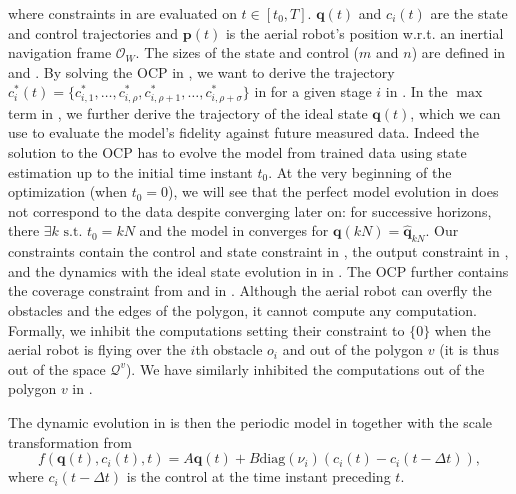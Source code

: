 where constraints in  are evaluated on $t\in[t_0,T]$. $\mathbf{q}(t)$ and $c_i(t)$ are the state and control trajectories and $\mathbf{p}(t)$ is the aerial robot's position w.r.t. an inertial navigation frame $\mathcal{O}_W$. The sizes of the state and control ($m$ and $n$) are defined in  and . By solving the OCP in , we want to derive the trajectory $c_i^*(t)=\{c^*_{i,1},\dots,c^*_{i,\rho},c^*_{i,\rho+1},\dots,c^*_{i,\rho+\sigma}\}$ in  for a given stage $i$ in . In the $\max$ term in , we further derive the trajectory of the ideal state $\mathbf{q}(t)$, which we can use to evaluate the model's fidelity against future measured data. Indeed the solution to the OCP has to  evolve the model from trained data using state estimation up to the initial time instant $t_0$. At the very beginning of the optimization (when $t_0=0$), we will see that the perfect model evolution in  does not correspond to the data despite converging later on: for successive horizons, there $\exists k\text{ s.t. }t_0=kN$ and the model in  converges for $\mathbf{q}(kN)=\hat{\mathbf{q}}_{kN}$. Our constraints contain the control and state constraint in , the output constraint in , and the dynamics with the ideal state evolution in  in . The OCP further contains the coverage constraint from  and  in . Although the aerial robot can overfly the obstacles and the edges of the polygon, it cannot compute any computation. Formally, we inhibit the computations setting their constraint to $\{0\}$ when the aerial robot is flying over the $i$th obstacle $o_i$ and out of the polygon $v$ (it is thus out of the space $\mathcal{Q}^v$). We have similarly inhibited the computations out of the polygon $v$ in .


The dynamic evolution in  is then the periodic model in  together with the scale transformation from 
\begin{equation}\label{eq:perf-model-in-mpc}
  f(\mathbf{q}(t),c_i(t),t)=A\mathbf{q}(t)+B\mathrm{diag}(\nu_i)(c_i(t)-c_i(t-\Delta t)),
\end{equation}
where $c_i(t-\Delta t)$ is the control at the time instant preceding $t$.


